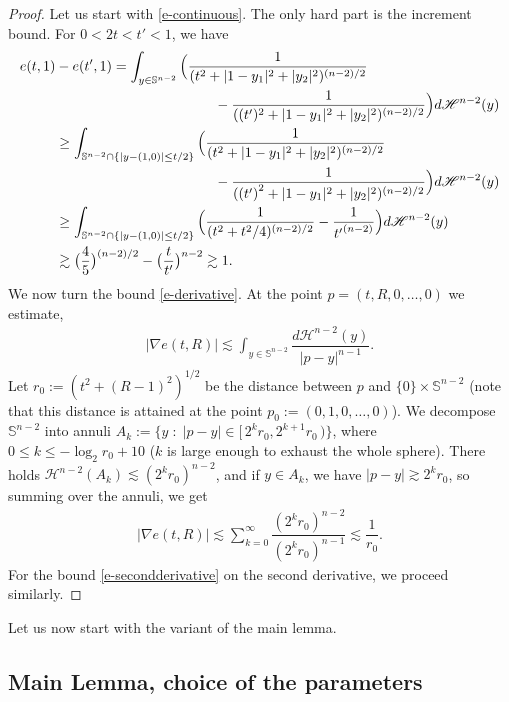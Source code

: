 \documentclass[JEP,XML,SOM,Unicode,published]{cedram}
\numberwithin{equation}{section}
\theoremstyle{plain}
\theoremstyle{definition}
\begin{document}
\begin{proof}
Let us start with \eqref{e-continuous}. The only hard part is the increment bound. For $0<2t<t'<1$, we have
\begin{align*}
e(t, 1) &-e(t',1) = \int_{y\in \mathbb{S}^{n-2}} \Big (\dfrac{1}{(t^2+ |1-y_1|^2 +|y_2|^2)^{(n-2)/2}} \\
&\hspace*{4cm}- \dfrac{1}{((t')^2+ |1-y_1|^2 +|y_2|^2)^{(n-2)/2}} \Big )d \mathscr{H}^{n-2}(y)\\
&\ge \int_{\mathbb{S}^{n-2}\cap \{|y-(1,0)| \le t/2\}} \Big (\dfrac{1}{(t^2+ |1-y_1|^2 +|y_2|^2)^{(n-2)/2}} \\
&\hspace*{4cm}- \dfrac{1}{({(t')}^2+ |1-y_1|^2 +|y_2|^2)^{(n-2)/2}} \Big )d \mathscr{H}^{n-2}(y)\\
&\ge \int_{\mathbb{S}^{n-2} \cap \{|y-(1,0)| \le t/2\}} \Big (\dfrac{1}{(t^2 + t^2/4 )^{(n-2)/2}} - \dfrac{1}{ {t'}^{(n-2)}} \Big ) d \mathscr{H}^{n-2}(y)\\
&\gtrsim \big( \dfrac{4}{5}\big )^{(n-2)/2} - \big (\dfrac{t}{t'}\big )^{n-2} \gtrsim 1 .
\end{align*}
We now turn the bound \eqref{e-derivative}. At the point $p=(t,R,0,\dots,0)$ we estimate,
\begin{align*}
|\nabla e(t,R)| \lesssim \int_{y\in \mathbb{S}^{n-2}} \dfrac{ d \mathscr{H}^{n-2}(y)}{ |p-y|^{n-1}}.
\end{align*}
Let $r_0:= (t^2 +(R-1)^2)^{1/2}$ be the distance between $p$ and $\{0\} \times \mathbb{S}^{n-2}$ (note that this distance is attained at the point $p_0:=(0,1,0,\dots, 0)$). We decompose $\mathbb{S}^{n-2}$ into annuli $A_k:= \{ y \; : \; |p-y|\in [\,2^k r_0, 2^{k+1} r_0\,)\}$, where $0 \le k \le -\log_2 r_0 + 10$ (\ie $k$ is large enough to exhaust the whole sphere). There holds $\mathscr{H}^{n-2}(A_k) \lesssim (2^k r_0)^{n-2}$, and if $y\in A_k$, we have $|p-y | \gtrsim 2^kr_0$, so summing over the annuli, we get
\begin{align*}
|\nabla e(t,R)| \lesssim \sum_{k=0}^{\infty} \dfrac{(2^kr_0)^{n-2}}{(2^kr_0) ^{n-1}} \lesssim \dfrac{1}{r_0}.
\end{align*}
For the bound \eqref{e-secondderivative} on the second derivative, we proceed similarly.
\end{proof}
Let us now start with the variant of the main lemma.

\subsection{Main Lemma, choice of the parameters}
\end{document}

